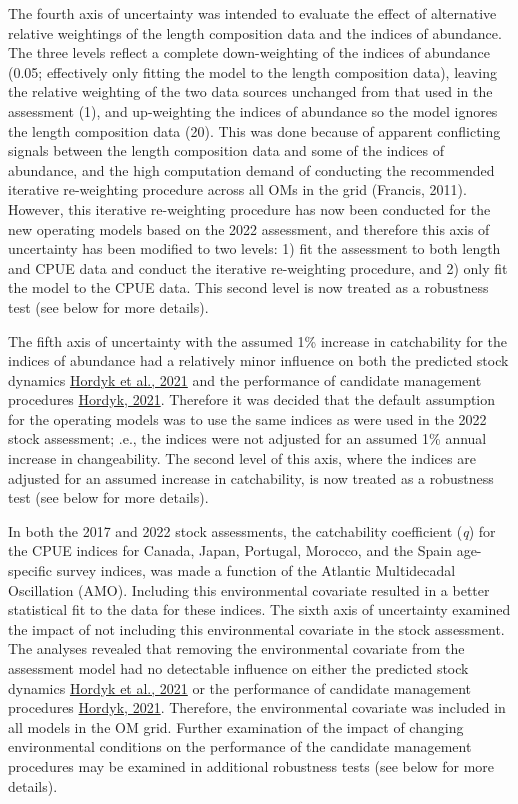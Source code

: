 \documentclass[
]{article}
\begin{document}
The fourth axis of uncertainty was intended to evaluate the effect of alternative relative weightings of the length composition data and the indices of abundance. The three levels reflect a complete down-weighting of the indices of abundance (0.05; effectively only fitting the model to the length composition data), leaving the relative weighting of the two data sources unchanged from that used in the assessment (1), and up-weighting the indices of abundance so the model ignores the length composition data (20). This was done because of apparent conflicting signals between the length composition data and some of the indices of abundance, and the high computation demand of conducting the recommended iterative re-weighting procedure across all OMs in the grid (Francis, 2011). However, this iterative re-weighting procedure has now been conducted for the new operating models based on the 2022 assessment, and therefore this axis of uncertainty has been modified to two levels: 1) fit the assessment to both length and CPUE data and conduct the iterative re-weighting procedure, and 2) only fit the model to the CPUE data. This second level is now treated as a robustness test (see below for more details).

The fifth axis of uncertainty with the assumed 1\% increase in catchability for the indices of abundance had a relatively minor influence on both the predicted stock dynamics \href{https://iccat.github.io/nswo-mse/SCRS_Papers//Hordyk_et_al_SCRS_2021_099.pdf}{Hordyk et al., 2021} and the performance of candidate management procedures \href{https://iccat.github.io/nswo-mse/SCRS_Papers//Hordyk_SCRS_2021_161.pdf}{Hordyk, 2021}. Therefore it was decided that the default assumption for the operating models was to use the same indices as were used in the 2022 stock assessment; .e., the indices were not adjusted for an assumed 1\% annual increase in changeability. The second level of this axis, where the indices are adjusted for an assumed increase in catchability, is now treated as a robustness test (see below for more details).

In both the 2017 and 2022 stock assessments, the catchability coefficient (\emph{q}) for the CPUE indices for Canada, Japan, Portugal, Morocco, and the Spain age-specific survey indices, was made a function of the Atlantic Multidecadal Oscillation (AMO). Including this environmental covariate resulted in a better statistical fit to the data for these indices. The sixth axis of uncertainty examined the impact of not including this environmental covariate in the stock assessment. The analyses revealed that removing the environmental covariate from the assessment model had no detectable influence on either the predicted stock dynamics \href{https://iccat.github.io/nswo-mse/SCRS_Papers//Hordyk_et_al_SCRS_2021_099.pdf}{Hordyk et al., 2021} or the performance of candidate management procedures \href{https://iccat.github.io/nswo-mse/SCRS_Papers//Hordyk_SCRS_2021_161.pdf}{Hordyk, 2021}. Therefore, the environmental covariate was included in all models in the OM grid. Further examination of the impact of changing environmental conditions on the performance of the candidate management procedures may be examined in additional robustness tests (see below for more details).
\end{document}
